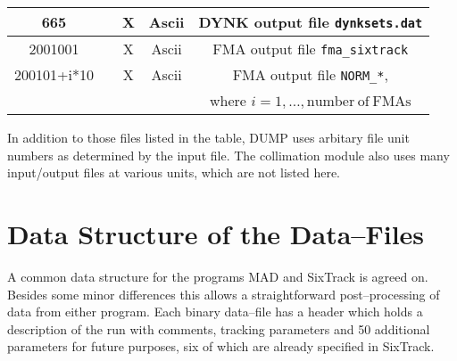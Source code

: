 \documentclass[a4paper,11pt]{report}
\begin{document}
\begin{center}
\begin{longtable}{|c|c|c|c|c|}
  \hline \rule[-3.75mm]{0mm}{10mm}
  665 & & X & Ascii & DYNK output file \texttt{dynksets.dat} \\
  \hline \rule[-3.75mm]{0mm}{10mm}
  2001001 & & X & Ascii & FMA output file \texttt{fma\_sixtrack} \\\hline \rule[-3.75mm]{0mm}{10mm}
  200101+i*10 & & X & Ascii & FMA output file \texttt{NORM\_*}, \\*
  \rule[-3.7mm]{0mm}{7.5mm}
  & & & & where $i=1,\ldots,\mathrm{number \ of \ FMAs}$ \\\hline
\end{longtable}
\end{center}


In addition to those files listed in the table, DUMP uses arbitary file unit numbers as determined by the input file. The collimation module also uses many input/output files at various units, which are not listed here.

\chapter{Data Structure of the Data--Files} \label{Header}

A common data structure for the programs MAD and SixTrack is agreed
on. Besides some minor differences this allows a straightforward
post--processing of data from either program. Each binary data--file
has a header which holds a description of the run with comments,
tracking parameters and 50 additional parameters for future purposes,
six of which are already specified in SixTrack\@.
\end{document}
